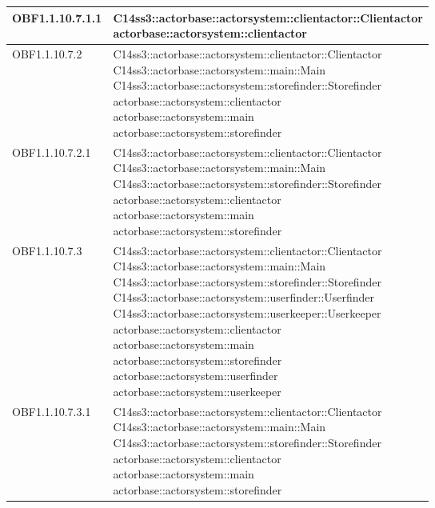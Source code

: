 \documentclass{scalatekids-article}
\begin{document}
\begin{longtable}[H]{|p{4.5cm}|p{13cm}|}
\hline
OBF1.1.10.7.1.1 & \multiLineCell[t]{C14ss3::actorbase::actorsystem::clientactor::Clientactor\\actorbase::actorsystem::clientactor\\}\\
\hline
OBF1.1.10.7.2 & \multiLineCell[t]{C14ss3::actorbase::actorsystem::clientactor::Clientactor\\C14ss3::actorbase::actorsystem::main::Main\\C14ss3::actorbase::actorsystem::storefinder::Storefinder\\actorbase::actorsystem::clientactor\\actorbase::actorsystem::main\\actorbase::actorsystem::storefinder\\}\\
\hline
OBF1.1.10.7.2.1 & \multiLineCell[t]{C14ss3::actorbase::actorsystem::clientactor::Clientactor\\C14ss3::actorbase::actorsystem::main::Main\\C14ss3::actorbase::actorsystem::storefinder::Storefinder\\actorbase::actorsystem::clientactor\\actorbase::actorsystem::main\\actorbase::actorsystem::storefinder\\}\\
\hline
OBF1.1.10.7.3 & \multiLineCell[t]{C14ss3::actorbase::actorsystem::clientactor::Clientactor\\C14ss3::actorbase::actorsystem::main::Main\\C14ss3::actorbase::actorsystem::storefinder::Storefinder\\C14ss3::actorbase::actorsystem::userfinder::Userfinder\\C14ss3::actorbase::actorsystem::userkeeper::Userkeeper\\actorbase::actorsystem::clientactor\\actorbase::actorsystem::main\\actorbase::actorsystem::storefinder\\actorbase::actorsystem::userfinder\\actorbase::actorsystem::userkeeper\\}\\
\hline
OBF1.1.10.7.3.1 & \multiLineCell[t]{C14ss3::actorbase::actorsystem::clientactor::Clientactor\\C14ss3::actorbase::actorsystem::main::Main\\C14ss3::actorbase::actorsystem::storefinder::Storefinder\\actorbase::actorsystem::clientactor\\actorbase::actorsystem::main\\actorbase::actorsystem::storefinder\\}\\

\end{longtable}
\end{document}
